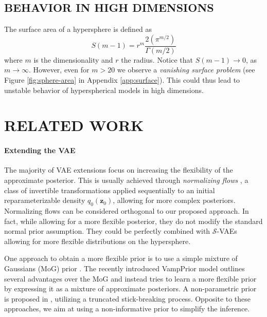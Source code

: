 \documentclass[letterpaper]{article}
\newcommand{\Sv}{$\mathcal{S}$}
\newcommand{\z}{\mathbf{z}}
\begin{document}
\subsection{BEHAVIOR IN HIGH DIMENSIONS}\label{subsec:high-dim}
The surface area of a hypersphere is defined as
\begin{equation}
    S(m-1) = r^m\frac{2(\pi^{m/2})}{\Gamma(m/2)}
\end{equation}
where $m$ is the dimensionality and $r$ the radius. Notice that $S(m-1) \to 0$, as $m \to \infty$. However, even for $m > 20$ we observe a \textit{vanishing surface problem} (see Figure \ref{fig:sphere-area} in Appendix \ref{app:surface}). This could thus lead to unstable behavior of hyperspherical models in high dimensions.

\section{RELATED WORK} \label{sec:related-work}

\label{par:vae-ext}
\paragraph{Extending the VAE} The majority of VAE extensions focus on increasing the flexibility of the approximate posterior. This is usually achieved through \textit{normalizing flows} \citep{normalizing-flows}, a class of invertible transformations applied sequentially to an initial reparameterizable density $q_{0}(\z_0)$, allowing for more complex posteriors. Normalizing flows can be considered orthogonal to our proposed approach. In fact, while allowing for a more flexible posterior, they do not modify the standard normal prior assumption. They could be perfectly combined with \Sv-VAEs allowing for more flexible distributions on the hypersphere.

One approach to obtain a more flexible prior is to use a simple mixture of Gaussians (MoG) prior \citep{gmm-prior-vae}. The recently introduced VampPrior model \citep{vamp-prior} outlines several advantages over the MoG and instead tries to learn a more flexible prior by expressing it as a mixture of approximate posteriors. A non-parametric prior is proposed in \citet{stick}, utilizing a truncated stick-breaking process. Opposite to these approaches, we aim at using a non-informative prior to simplify the inference.
\end{document}
